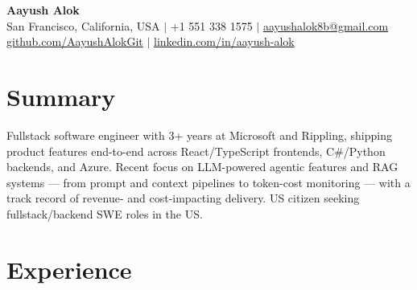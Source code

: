 \documentclass[letterpaper,10pt]{article}
\begin{document}
\begin{center}
  {\Huge\bfseries Aayush Alok}\\[4pt]
  San Francisco, California, USA \quad$\vert$\quad
  +1 551 338 1575 \quad$\vert$\quad
  \href{mailto:aayushalok8b@gmail.com}{aayushalok8b@gmail.com}\\[2pt]
  \href{https://github.com/AayushAlokGit}{github.com/AayushAlokGit} \quad$\vert$\quad
  \href{https://www.linkedin.com/in/aayush-alok-b728b2171}{linkedin.com/in/aayush-alok}
\end{center}

\section{Summary}
Fullstack software engineer with 3+ years at Microsoft and Rippling, shipping
product features end-to-end across React/TypeScript frontends, C\#/Python
backends, and Azure. Recent focus on LLM-powered agentic features and RAG
systems --- from prompt and context pipelines to token-cost monitoring ---
with a track record of revenue- and cost-impacting delivery. US citizen seeking
fullstack/backend SWE roles in the US.

\section{Experience}
\end{document}
